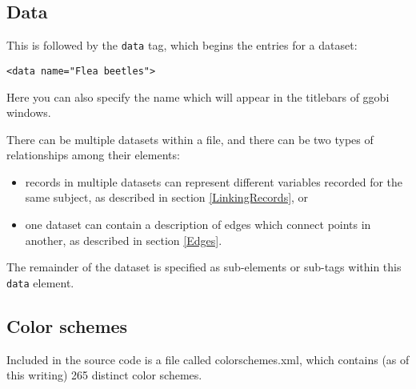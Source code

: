 \documentclass{article}
\begin{document}
\subsection{Data}

This is followed by the \texttt{data} tag, which begins the
entries for a dataset:

\begin{verbatim}
<data name="Flea beetles">
\end{verbatim}
%
Here you can also specify the name which will appear in the titlebars
of ggobi windows.

There can be multiple datasets within a file, and there can be two
types of relationships among their elements: 
\begin{itemize}
\item records in multiple datasets can represent different variables
  recorded for the same subject, as described in section
  \ref{LinkingRecords}, or
\item one dataset can contain a description of edges which connect
  points in another, as described in section \ref{Edges}.
\end{itemize}

The remainder of the dataset is specified as sub-elements or sub-tags
within this \texttt{data} element.

\subsection{Color schemes}

Included in the source code is a file called colorschemes.xml,
which contains (as of this writing) 265 distinct color schemes.
\end{document}

